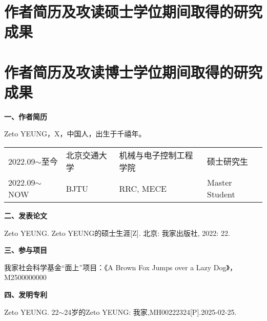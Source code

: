 \ifmaster
  \chapter*{作者简历及攻读硕士学位期间取得的研究成果}
\else
  \chapter*{作者简历及攻读博士学位期间取得的研究成果}
\fi


\textbf{一、作者简历}

Zeto YEUNG，X，中国人，出生于千禧年。

\vspace{-10pt}

\begin{table}[H]
  \centering
  \renewcommand\arraystretch{0.8} %
  \begin{tabular}{llll}
    2022.09$\sim$至今    & 北京交通大学 & 机械与电子控制工程学院 & 硕士研究生 \\
    2022.09$\sim$NOW    & BJTU & RRC, MECE & Master Student \\
  \end{tabular}
\end{table}

\textbf{二、发表论文}

\begin{enumerate}[label={[}\arabic*{]}]
	\item Zeto YEUNG. Zeto YEUNG的硕士生涯[Z]. 北京: 我家出版社, 2022: 22.
\end{enumerate}

\vspace{18pt}

\textbf{三、参与项目}

\begin{enumerate}[label={[}\arabic*{]}]
	\item 我家社会科学基金“面上”项目：《A Brown Fox Jumps over a Lazy Dog》，M2500000000
\end{enumerate}

\vspace{18pt}

\textbf{四、发明专利}

\begin{enumerate}[label={[}\arabic*{]}]
	\item Zeto YEUNG. 22$\sim$24岁的Zeto YEUNG: 我家,MH00222324[P].2025-02-25.
\end{enumerate}

